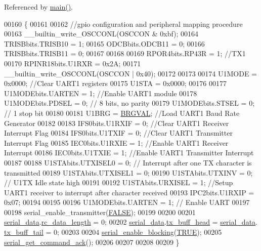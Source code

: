 Referenced by \hyperlink{a00048_source_l00080}{main()}.


\begin{DoxyCode}
00160 \{
00161 
00162     \textcolor{comment}{//gpio configuration and peripheral mapping procedure}
00163          \_\_builtin\_write\_OSCCONL(OSCCON & 0xbf);
00164              TRISBbits.TRISB10 = 1;
00165              ODCBbits.ODCB11   = 0;
00166              TRISBbits.TRISB11 = 0;
00167       
00168         
00169              RPOR4bits.RP43R   = 1; \textcolor{comment}{//TX1}
00170              RPINR18bits.U1RXR = 0x2A;
00171          \_\_builtin\_write\_OSCCONL(OSCCON | 0x40);
00172 
00173 
00174     U1MODE = 0x0000;            \textcolor{comment}{//Clear UART1 registers}
00175     U1STA  = 0x0000;
00176 
00177     U1MODEbits.UARTEN = 1;      \textcolor{comment}{//Enable UART1 module}
00178     U1MODEbits.PDSEL  = 0;      \textcolor{comment}{// 8 bits, no parity}
00179     U1MODEbits.STSEL  = 0;      \textcolor{comment}{// 1 stop bit}
00180 
00181     U1BRG = \hyperlink{a00030_aca346e181d2ffc089e22e75736a6ff63}{BRGVAL};             \textcolor{comment}{//Load UART1 Baud Rate Generator}
00182 
00183     IFS0bits.U1RXIF   = 0;      \textcolor{comment}{//Clear UART1 Receiver Interrupt Flag}
00184     IFS0bits.U1TXIF   = 0;      \textcolor{comment}{//Clear UART1 Transmitter Interrupt Flag}
00185     IEC0bits.U1RXIE   = 1;      \textcolor{comment}{//Enable UART1 Receiver Interrupt}
00186     IEC0bits.U1TXIE   = 1;      \textcolor{comment}{//Enable UART1 Transmitter Interrupt}
00187 
00188     U1STAbits.UTXISEL0 = 0;     \textcolor{comment}{// Interrupt after one TX character is transmitted}
00189     U1STAbits.UTXISEL1 = 0;
00190     U1STAbits.UTXINV   = 0;     \textcolor{comment}{// U1TX Idle state high}
00191 
00192     U1STAbits.URXISEL  = 1;     \textcolor{comment}{//Setup UART1  receiver to interrupt after character received}
00193     IPC2bits.U1RXIP    = 0x07;
00194     
00195 
00196     U1MODEbits.UARTEN  = 1;     \textcolor{comment}{// Enable UART}
00197 
00198     serial\_enable\_transmitter(\hyperlink{a00040_aa93f0eb578d23995850d61f7d61c55c1}{FALSE});
00199     
00200 
00201     \hyperlink{a00030_a77d3b77ccd59a0065642bf1ac7887b9d}{serial\_data}.\hyperlink{a00030_ab136d4fef2c523afd55b6ca74c46d7cc}{rc\_data\_length} = 0;
00202     \hyperlink{a00030_a77d3b77ccd59a0065642bf1ac7887b9d}{serial\_data}.\hyperlink{a00030_a3e2eda0a020422511de91b2bc7386083}{tx\_buff\_head} = \hyperlink{a00030_a77d3b77ccd59a0065642bf1ac7887b9d}{serial\_data}.
      \hyperlink{a00030_a6287e1447d7902b8bbc2f6359065dcbd}{tx\_buff\_tail} = 0;
00203 
00204     \hyperlink{a00030_af15ca641f181de14f789d97b00c367ef}{serial\_enable\_blocking}(\hyperlink{a00040_aa8cecfc5c5c054d2875c03e77b7be15d}{TRUE});
00205     \hyperlink{a00030_a7fc7421ed15d6e4516e9878e7455d715}{serial\_get\_command\_ack}();
00206 
00207 
00208 
00209 \}
\end{DoxyCode}



